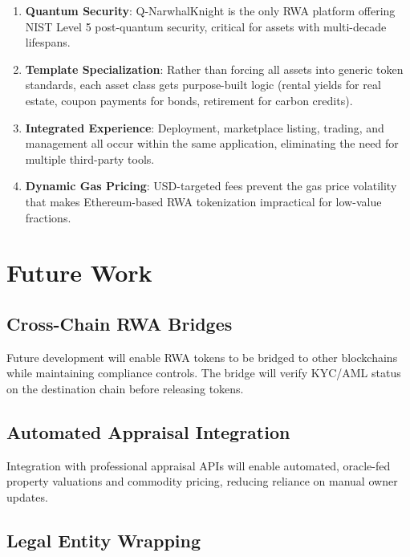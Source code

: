 \documentclass[11pt,a4paper,twoside]{article}
\begin{document}
\begin{enumerate}
  \item \textbf{Quantum Security}: Q-NarwhalKnight is the only RWA platform offering NIST Level 5 post-quantum security, critical for assets with multi-decade lifespans.

  \item \textbf{Template Specialization}: Rather than forcing all assets into generic token standards, each asset class gets purpose-built logic (rental yields for real estate, coupon payments for bonds, retirement for carbon credits).

  \item \textbf{Integrated Experience}: Deployment, marketplace listing, trading, and management all occur within the same application, eliminating the need for multiple third-party tools.

  \item \textbf{Dynamic Gas Pricing}: USD-targeted fees prevent the gas price volatility that makes Ethereum-based RWA tokenization impractical for low-value fractions.
\end{enumerate}

\section{Future Work}
\label{sec:future}

\subsection{Cross-Chain RWA Bridges}

Future development will enable RWA tokens to be bridged to other blockchains while maintaining compliance controls. The bridge will verify KYC/AML status on the destination chain before releasing tokens.

\subsection{Automated Appraisal Integration}

Integration with professional appraisal APIs will enable automated, oracle-fed property valuations and commodity pricing, reducing reliance on manual owner updates.

\subsection{Legal Entity Wrapping}
\end{document}
